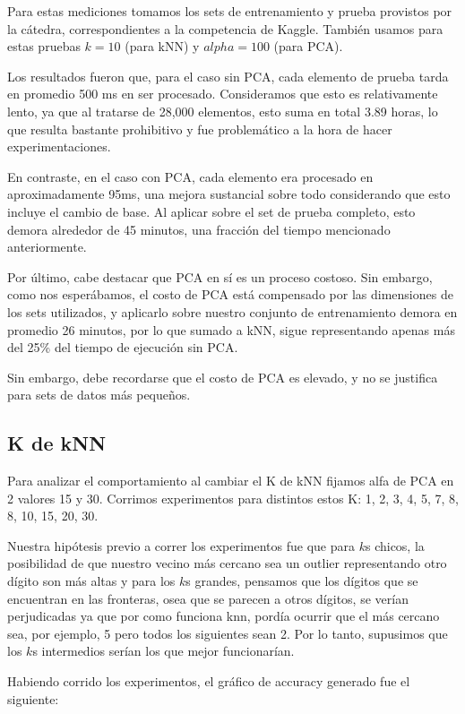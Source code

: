 Para estas mediciones tomamos los sets de entrenamiento y prueba provistos por la cátedra, correspondientes a la competencia de Kaggle. También usamos para estas pruebas $k = 10$ (para kNN) y $alpha = 100$ (para PCA). 

Los resultados fueron que, para el caso sin PCA, cada elemento de prueba tarda en promedio 500 ms en ser procesado. Consideramos que esto es relativamente lento, ya que al tratarse de 28,000 elementos, esto suma en total 3.89 horas, lo que resulta bastante prohibitivo y fue problemático a la hora de hacer experimentaciones.

En contraste, en el caso con PCA, cada elemento era procesado en aproximadamente 95ms, una mejora sustancial sobre todo considerando que esto incluye el cambio de base. Al aplicar sobre el set de prueba completo, esto demora alrededor de 45 minutos, una fracción del tiempo mencionado anteriormente.

Por último, cabe destacar que PCA en sí es un proceso costoso. Sin embargo, como nos esperábamos, el costo de PCA está compensado por las dimensiones de los sets utilizados, y aplicarlo sobre nuestro conjunto de entrenamiento demora en promedio 26 minutos, por lo que sumado a kNN, sigue representando apenas más del 25\% del tiempo de ejecución sin PCA.

Sin embargo, debe recordarse que el costo de PCA es elevado, y no se justifica para sets de datos más pequeños.

\subsection{K de kNN}

Para analizar el comportamiento al cambiar el K de kNN fijamos alfa de PCA en 2 valores 15 y 30. Corrimos experimentos para distintos estos K: 1, 2, 3, 4, 5, 7, 8, 8, 10, 15, 20, 30.

Nuestra hipótesis previo a correr los experimentos fue que para $k$s chicos, la posibilidad de que nuestro vecino más cercano sea un outlier representando otro dígito son más altas y para los $k$s grandes, pensamos que los dígitos que se encuentran en las fronteras, osea que se parecen a otros dígitos, se verían perjudicadas ya que por como funciona knn, pordía ocurrir que el más cercano sea, por ejemplo, 5 pero todos los siguientes sean 2. Por lo tanto, supusimos que los $k$s intermedios serían los que mejor funcionarían.

Habiendo corrido los experimentos, el gráfico de accuracy generado fue el siguiente:

